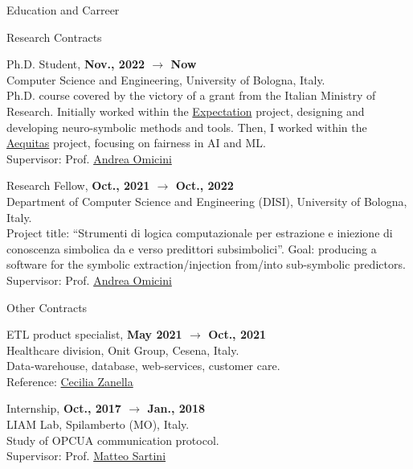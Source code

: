 \documentclass{resume} %
\begin{document}
\begin{rSection}{Education and Carreer}
\begin{rSubsection}{Research Contracts}{}{}{}
            \item Ph.D. Student, \textbf{Nov., 2022 $\rightarrow$ Now}
            \\Computer Science and Engineering, University of Bologna, Italy.
            \\Ph.D. course covered by the victory of a grant from the Italian Ministry of Research.
            Initially worked within the \href{https://expectation.ehealth.hevs.ch/posts/home/}{Expectation} project, designing and developing neuro-symbolic methods and tools.
            Then, I worked within the \href{https://www.aequitas-project.eu/}{Aequitas} project, focusing on fairness in AI and ML.
            \\Supervisor: Prof. \href{mailto:andrea.omicini@unibo.it}{Andrea Omicini}
            \item Research Fellow, \textbf{Oct., 2021 $\rightarrow$ Oct., 2022}
            \\Department of Computer Science and Engineering (DISI), University of Bologna, Italy.
            \\Project title: ``Strumenti di logica computazionale per estrazione e iniezione di conoscenza simbolica da e verso predittori subsimbolici''.
            Goal: producing a software for the symbolic extraction/injection from/into sub-symbolic predictors.
            \\Supervisor: Prof. \href{mailto:andrea.omicini@unibo.it}{Andrea Omicini}

        \end{rSubsection}


        \begin{rSubsection}{Other Contracts}{}{}{}

            \item ETL product specialist, \textbf{May 2021 $\rightarrow$ Oct., 2021}
            \\Healthcare division, Onit Group, Cesena, Italy.
            \\Data-warehouse, database, web-services, customer care.
            \\Reference: \href{mailto:czanella@onit.it}{Cecilia Zanella}
            \item Internship, \textbf{Oct., 2017 $\rightarrow$ Jan., 2018}
            \\LIAM Lab, Spilamberto (MO), Italy.
            \\Study of OPCUA communication protocol.
            \\Supervisor: Prof. \href{mailto:matteo.sartini@unibo.it}{Matteo Sartini}

        \end{rSubsection}

        
    \end{rSection}
\end{document}
